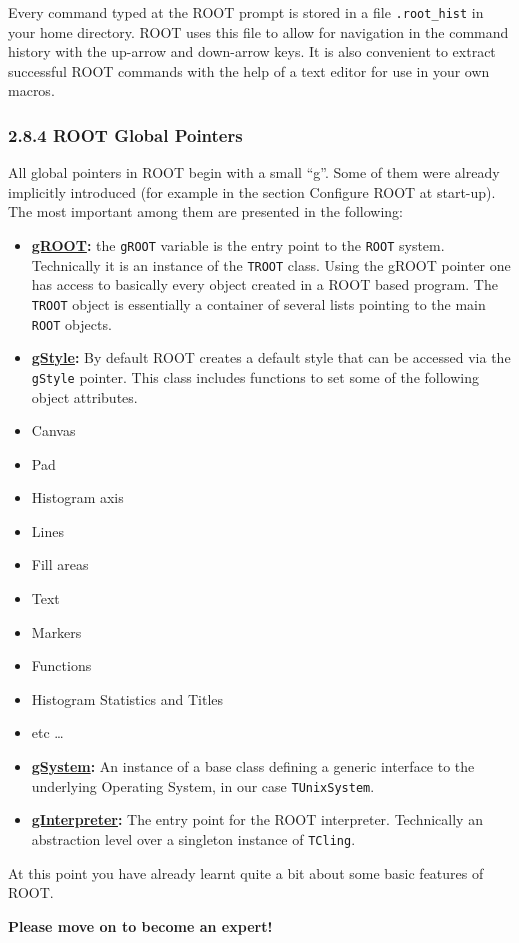 \documentclass{article}
\begin{document}
Every command typed at the ROOT prompt is stored in a file
\texttt{.root\_hist} in your home directory. ROOT uses this file to
allow for navigation in the command history with the up-arrow and
down-arrow keys. It is also convenient to extract successful ROOT
commands with the help of a text editor for use in your own macros.

\subsubsection{2.8.4 ROOT Global Pointers}\label{root-global-pointers}

All global pointers in ROOT begin with a small ``g''. Some of them were
already implicitly introduced (for example in the section Configure ROOT
at start-up). The most important among them are presented in the
following:

\begin{itemize}
\item
  \textbf{\href{http://root.cern.ch/root/htmldoc/TROOT.html}{gROOT}:}
  the \texttt{gROOT} variable is the entry point to the \texttt{ROOT}
  system. Technically it is an instance of the \texttt{TROOT} class.
  Using the gROOT pointer one has access to basically every object
  created in a ROOT based program. The \texttt{TROOT} object is
  essentially a container of several lists pointing to the main
  \texttt{ROOT} objects.
\item
  \textbf{\href{http://root.cern.ch/root/htmldoc/TStyle.html}{gStyle}:}
  By default ROOT creates a default style that can be accessed via the
  \texttt{gStyle} pointer. This class includes functions to set some of
  the following object attributes.
\item
  Canvas
\item
  Pad
\item
  Histogram axis
\item
  Lines
\item
  Fill areas
\item
  Text
\item
  Markers
\item
  Functions
\item
  Histogram Statistics and Titles
\item
  etc \ldots{}
\item
  \textbf{\href{http://root.cern.ch/root/htmldoc/TSystem.html}{gSystem}:}
  An instance of a base class defining a generic interface to the
  underlying Operating System, in our case \texttt{TUnixSystem}.
\item
  \textbf{\href{http://root.cern.ch/htmldoc/html/TInterpreter.html}{gInterpreter}:}
  The entry point for the ROOT interpreter. Technically an abstraction
  level over a singleton instance of \texttt{TCling}.
\end{itemize}

At this point you have already learnt quite a bit about some basic
features of ROOT.

\textbf{Please move on to become an expert!}


    
    
    
    
\end{document}

